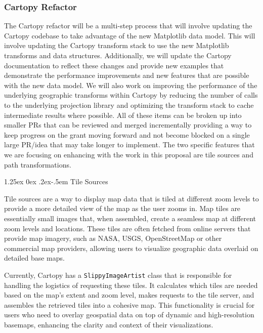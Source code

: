 \documentclass[12pt]{article}
\makeatletter
\numberwithin{page}{section}
\renewcommand{\paragraph}{%
  \@startsection{paragraph}{4}%
  {\z@}{1.25ex \@plus 0ex \@minus .2ex}{-.5em}%
  {\normalfont\normalsize\itshape\bfseries}%
}
\makeatother
\begin{document}

\subsubsection{Cartopy Refactor}

The Cartopy refactor will be a multi-step process that will involve updating the
Cartopy codebase to take advantage of the new Matplotlib data model. This will
involve updating the Cartopy transform stack to use the new Matplotlib transforms
and data structures. Additionally, we will update the Cartopy documentation to
reflect these changes and provide new examples that demonstrate the performance
improvements and new features that are possible with the new data model. We will
also work on improving the performance of the underlying geographic transforms within Cartopy
by reducing the number of calls to the underlying projection library and optimizing
the transform stack to cache intermediate results where possible. All of these items
can be broken up into smaller PRs that can be reviewed and merged incrementally providing
a way to keep progress on the grant moving forward and not become blocked on a single
large PR/idea that may take longer to implement. The two specific features that we are
focusing on enhancing with the work in this proposal are tile sources and path transformations.

\paragraph{Tile Sources}

Tile sources are a way to display map data that is
tiled at different zoom levels to provide a more detailed view of the map as the user zooms
in. Map tiles are essentially small images that, when assembled, create a seamless map at
different zoom levels and locations. These tiles are often fetched from online servers
that provide map imagery, such as NASA, USGS, OpenStreetMap or other commercial map providers,
allowing users to visualize geographic data overlaid on detailed base maps.

Currently, Cartopy has a \texttt{SlippyImageArtist} class that is responsible for handling the
logistics of requesting these tiles. It calculates which tiles are needed based on the
map's extent and zoom level, makes requests to the tile server, and assembles the retrieved
tiles into a cohesive map. This functionality is crucial for users who need to overlay geospatial
data on top of dynamic and high-resolution basemaps, enhancing the clarity and context of
their visualizations.
\end{document}
